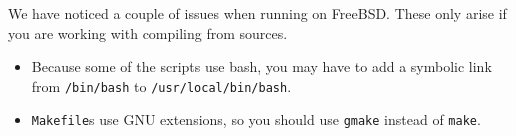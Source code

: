 
We have noticed a couple of issues when running {\mlton} on FreeBSD.  These
only arise if you are working with compiling {\mlton} from sources.

\begin{itemize}

\item Because some of the {\mlton} scripts use bash, you may have to add a
symbolic link from {\tt /bin/bash} to {\tt /usr/local/bin/bash}.

\item {\mlton} {\tt Makefile}s use GNU extensions, so you should use {\tt gmake}
instead of {\tt make}.

\end{itemize}
